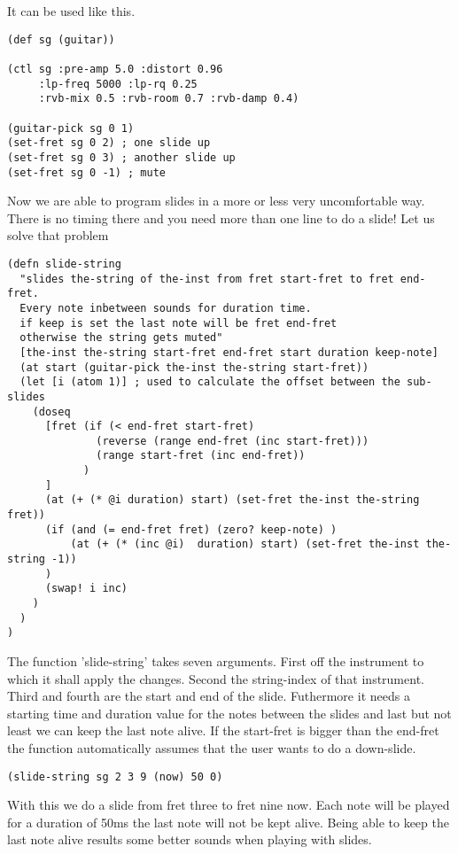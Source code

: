 It can be used like this.

\begin{lstlisting}
(def sg (guitar))

(ctl sg :pre-amp 5.0 :distort 0.96
     :lp-freq 5000 :lp-rq 0.25
     :rvb-mix 0.5 :rvb-room 0.7 :rvb-damp 0.4)

(guitar-pick sg 0 1)
(set-fret sg 0 2) ; one slide up
(set-fret sg 0 3) ; another slide up
(set-fret sg 0 -1) ; mute
\end{lstlisting}

Now we are able to program slides in a more or less very uncomfortable way. There is no timing there and you need more than one line to do a slide!
Let us solve that problem

\begin{lstlisting}
(defn slide-string
  "slides the-string of the-inst from fret start-fret to fret end-fret.
  Every note inbetween sounds for duration time.
  if keep is set the last note will be fret end-fret
  otherwise the string gets muted"
  [the-inst the-string start-fret end-fret start duration keep-note]
  (at start (guitar-pick the-inst the-string start-fret))
  (let [i (atom 1)] ; used to calculate the offset between the sub-slides
    (doseq 
      [fret (if (< end-fret start-fret) 
              (reverse (range end-fret (inc start-fret)))
              (range start-fret (inc end-fret))
            )
      ]
      (at (+ (* @i duration) start) (set-fret the-inst the-string fret))
      (if (and (= end-fret fret) (zero? keep-note) ) 
          (at (+ (* (inc @i)  duration) start) (set-fret the-inst the-string -1))
      )
      (swap! i inc)
    )
  )
)
\end{lstlisting}

The function 'slide-string' takes seven arguments. First off the instrument to which it shall apply the changes. Second the string-index of that instrument. Third and fourth are the start and end of the slide. Futhermore it needs a starting time and duration value for the notes between the slides and last but not least we can keep the last note alive. If the start-fret is bigger than the end-fret the function automatically assumes that the user wants to do a down-slide.

\begin{lstlisting}
(slide-string sg 2 3 9 (now) 50 0)
\end{lstlisting}

With this we do a slide from fret three to fret nine now. Each note will be played for a duration of 50ms the last note will not be kept alive. Being able to keep the last note alive results some better sounds when playing with slides.

